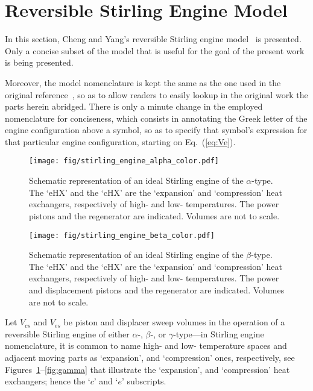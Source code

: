 \section{Reversible Stirling Engine Model}

    In     this     section,     Cheng     and     Yang's     reversible     Stirling     engine
    model~\cite{2012-ChengCH+YangHS-ApEnergy} is presented. Only a concise subset of  the  model
    that is useful for the goal of the present work is being presented.

    Moreover, the model nomenclature  is  kept  the  same  as  the  one  used  in  the  original
    reference~\cite{2012-ChengCH+YangHS-ApEnergy}, so as to allow readers to  easily  lookup  in
    the original work the parts herein abridged. There is only a minute change in  the  employed
    nomenclature for conciseness, which consists in annotating the Greek letter  of  the  engine
    configuration above a symbol, so as to specify that symbol's expression for that  particular
    engine configuration, starting on Eq.~(\ref{eq:Ve}).

    \begin{figure}[ht]
        \centering
        \texttt{[image: fig/stirling\_engine\_alpha\_color.pdf]}
        \caption{Schematic representation of an ideal Stirling engine of the $\alpha$-type.  The
            `eHX'  and  the  `cHX'  are  the  `expansion'  and  `compression'  heat  exchangers,
            respectively of high- and low- temperatures. The power pistons and  the  regenerator
            are indicated. Volumes are not to scale.}
        \label{fig:alpha}
    \end{figure}

    \begin{figure}[ht]
        \centering
        \texttt{[image: fig/stirling\_engine\_beta\_color.pdf]}
        \caption{Schematic representation of an ideal Stirling engine of the  $\beta$-type.  The
            `eHX'  and  the  `cHX'  are  the  `expansion'  and  `compression'  heat  exchangers,
            respectively of high- and low- temperatures. The power and displacement pistons  and
            the regenerator are indicated. Volumes are not to scale.}
        \label{fig:beta}
    \end{figure}

    Let $V_{cs}$ and $V_{es}$ be piston and displacer  sweep  volumes  in  the  operation  of  a
    reversible Stirling engine of either $\alpha$-,  $\beta$-,  or  $\gamma$-type---in  Stirling
    engine nomenclature, it is common to name high- and low-  temperature  spaces  and  adjacent
    moving   parts   as    `expansion',    and    `compression'    ones,    respectively,    see
    Figures~\ref{fig:alpha}--\ref{fig:gamma} that illustrate the `expansion', and  `compression'
    heat exchangers; hence the `$c$' and `$e$' subscripts.

